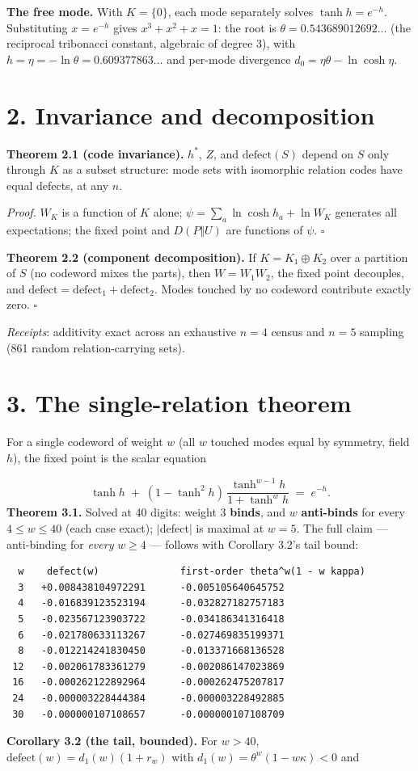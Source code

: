\documentclass[11pt]{article}
\begin{document}
\textbf{The free mode.}  With $K = \{0\}$, each mode separately solves $\tanh h = e^{-h}$.  Substituting $x = e^{-h}$ gives $x^3 + x^2 + x = 1$: the root is $\theta = 0.543689012692\ldots$ (the reciprocal tribonacci constant, algebraic of degree 3), with $h = \eta = -\ln\theta = 0.609377863\ldots$ and per-mode divergence $d_0 = \eta\theta - \ln\cosh\eta$.

\section*{2. Invariance and decomposition}
\textbf{Theorem 2.1 (code invariance).}  $h^*$, $Z$, and $\mathrm{defect}(S)$ depend on $S$ only through $K$ as a subset structure: mode sets with isomorphic relation codes have equal defects, at any $n$.

\emph{Proof.}  $W_K$ is a function of $K$ alone; $\psi = \sum_a \ln\cosh h_a + \ln W_K$ generates all expectations; the fixed point and $D(P\Vert U)$ are functions of $\psi$. $\square$

\textbf{Theorem 2.2 (component decomposition).}  If $K = K_1 \oplus K_2$ over a partition of $S$ (no codeword mixes the parts), then $W = W_1 W_2$, the fixed point decouples, and $\mathrm{defect} = \mathrm{defect}_1 + \mathrm{defect}_2$.  Modes touched by no codeword contribute exactly zero.  $\square$

\emph{Receipts}: additivity exact across an exhaustive $n = 4$ census and $n = 5$ sampling (861 random relation-carrying sets).

\section*{3. The single-relation theorem}
For a single codeword of weight $w$ (all $w$ touched modes equal by symmetry, field $h$), the fixed point is the scalar equation

\[
\tanh h \;+\; (1-\tanh^2 h)\,
\frac{\tanh^{w-1}h}{1+\tanh^{w}h} \;=\; e^{-h}.
\]
\textbf{Theorem 3.1.}  Solved at 40 digits: weight 3 \textbf{binds}, and $w$ \textbf{anti-binds} for every $4 \le w \le 40$ (each case exact); $|$defect$|$ is maximal at $w = 5$.  The full claim — anti-binding for \emph{every} $w \ge 4$ — follows with Corollary 3.2's tail bound:

\begin{small}\begin{verbatim}
  w    defect(w)              first-order theta^w(1 - w kappa)
  3   +0.008438104972291      -0.005105640645752
  4   -0.016839123523194      -0.032827182757183
  5   -0.023567123903722      -0.034186341316418
  6   -0.021780633113267      -0.027469835199371
  8   -0.012214241830450      -0.013371668136528
 12   -0.002061783361279      -0.002086147023869
 16   -0.000262122892964      -0.000262475207817
 24   -0.000003228444384      -0.000003228492885
 30   -0.000000107108657      -0.000000107108709
\end{verbatim}\end{small}
\textbf{Corollary 3.2 (the tail, bounded).}  For $w > 40$, $\mathrm{defect}(w) = d_1(w)(1 + r_w)$ with $d_1(w) = \theta^w(1 - w\kappa) < 0$ and
\end{document}

